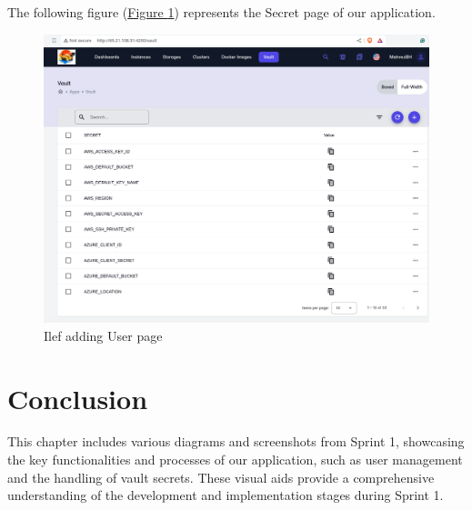 The following figure (\hyperref[fig:vault_page]{Figure \ref{fig:vault_page}})  represents the Secret page of our application.
\begin{figure}[h]
  \center
  \includegraphics[width=15cm]{./chapters/sprint1/vault.png}
  \caption{Ilef adding User page}
  \label{fig:vault_page}
\end{figure}
\vspace*{15cm}

\section*{Conclusion}
This chapter includes various diagrams and screenshots from Sprint 1, showcasing the key functionalities and processes of our application, such as user management and the handling of vault secrets. These visual aids provide a comprehensive understanding of the development and implementation stages during Sprint 1.